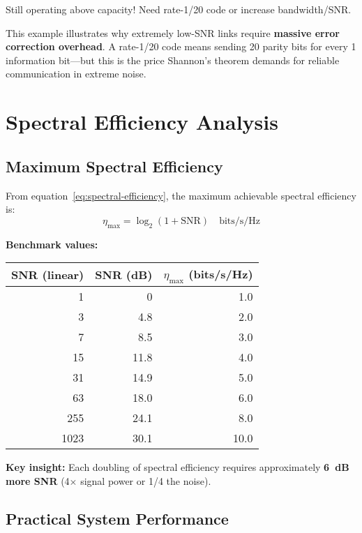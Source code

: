 Still operating above capacity! Need rate-1/20 code or increase bandwidth/SNR.

\begin{warningbox}
This example illustrates why extremely low-SNR links require \textbf{massive error correction overhead}. A rate-1/20 code means sending 20 parity bits for every 1 information bit---but this is the price Shannon's theorem demands for reliable communication in extreme noise.
\end{warningbox}

\section{Spectral Efficiency Analysis}

\subsection{Maximum Spectral Efficiency}

From equation~\eqref{eq:spectral-efficiency}, the maximum achievable spectral efficiency is:
\begin{equation}
\eta_{\max} = \log_2(1 + \mathrm{SNR}) \quad \text{bits/s/Hz}
\end{equation}

\textbf{Benchmark values:}

\begin{center}
\begin{tabular}{@{}rrr@{}}
\toprule
SNR (linear) & SNR (dB) & $\eta_{\max}$ (bits/s/Hz) \\
\midrule
1 & 0 & 1.0 \\
3 & 4.8 & 2.0 \\
7 & 8.5 & 3.0 \\
15 & 11.8 & 4.0 \\
31 & 14.9 & 5.0 \\
63 & 18.0 & 6.0 \\
255 & 24.1 & 8.0 \\
1023 & 30.1 & 10.0 \\
\bottomrule
\end{tabular}
\end{center}

\textbf{Key insight:} Each doubling of spectral efficiency requires approximately \textbf{6~dB more SNR} (4$\times$ signal power or 1/4 the noise).

\subsection{Practical System Performance}

